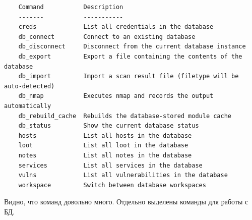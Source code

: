 \documentclass[10pt,a4paper,titlepage]{article}
\begin{document}
\begin{verbatim}
    Command           Description
    -------           -----------
    creds             List all credentials in the database
    db_connect        Connect to an existing database
    db_disconnect     Disconnect from the current database instance
    db_export         Export a file containing the contents of the database
    db_import         Import a scan result file (filetype will be auto-detected)
    db_nmap           Executes nmap and records the output automatically
    db_rebuild_cache  Rebuilds the database-stored module cache
    db_status         Show the current database status
    hosts             List all hosts in the database
    loot              List all loot in the database
    notes             List all notes in the database
    services          List all services in the database
    vulns             List all vulnerabilities in the database
    workspace         Switch between database workspaces

\end{verbatim}

Видно, что команд довольно много. Отдельно выделены команды для работы с БД.
\end{document}
